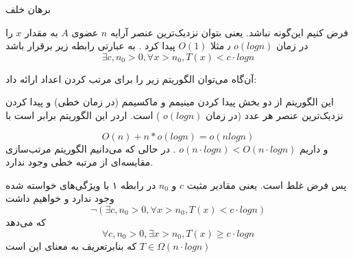 \proof
برهان خلف

فرض کنیم این‌گونه نباشد. یعنی بتوان نزدیک‌ترین عنصر آرایه 
$n$
عضوی 
$A$
به مقدار 
$x$
را در زمان 
$o(logn)$
٫ مثلا 
$O(1)$
پیدا کرد
.
به عبارتی رابطه زیر برقرار باشد
\begin{equation}
	\exists c, n_0 > 0 , \forall x > n_0, T(x) < c\cdot logn
\end{equation}

آن‌گاه می‌توان الگوریتم زیر را برای مرتب کردن اعداد ارائه داد:

این الگوریتم از دو بخش پیدا کردن مینیمم و ماکسیمم (در زمان خطی) و پیدا کردن نزدیک‌ترین عنصر هر عدد (در زمان 
$o(logn)$
)
است.
اردر این الگوریتم
برابر است با

\begin{equation*}
	O(n) + n * o(logn) = o(nlogn)
\end{equation*}
و داریم 
$o(n\cdot log n) < O(n\cdot log n)$
.
در حالی که می‌دانیم الگوریتم‌ مرتب‌‌سازی مقایسه‌ای از مرتبه خطی وجود ندارد.

پس فرض غلط است.
یعنی مقادیر مثبت $c$ و $n_0$ 
در رابطه ۱ با ویژگی‌های خواسته شده وجود ندارد و خواهیم داشت
\begin{equation}
	\neg (\exists c, n_0 > 0 , \forall x > n_0, T(x) < c\cdot logn)
\end{equation}
که می‌دهد
\begin{equation}
	\forall c, n_0 > 0 , \exists x > n_0, T(x) \geq c\cdot logn
\end{equation}
که بنابرتعریف به معنای این است 
$T \in \Omega(n\cdot logn)$